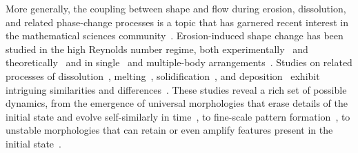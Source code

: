 \documentclass[11pt]{article}
\begin{document}
More generally, the coupling between shape and flow during erosion, dissolution, and related phase-change processes is a topic that has garnered recent interest in the mathematical sciences community~\cite{Ristroph2012, rycroft2016asymmetric, cohen2016erosion, MooreCPAM2017, mitchell2017generalized, Quaife2018, wykes2018self, lachaussee2018competitive, lopez2018cfd, ristroph2018sculpting}.  Erosion-induced shape change has been studied in the high Reynolds number regime, both experimentally~\cite{Ristroph2012, MoorePOF2013} and theoretically~\cite{MoorePOF2013, MooreCPAM2017, hewett2017evolution} and in single~\cite{Ristroph2012, MoorePOF2013, MooreCPAM2017, lachaussee2018competitive} and multiple-body arrangements~\cite{hewett2017evolution}.  Studies on related processes of dissolution~\cite{HuangJFM2015, kondratiuk2015steadily, cohen2016erosion, claudin2017dissolution, wykes2018self, huang2017solute}, melting~\cite{Cummings1999, back2014effect, rycroft2016asymmetric, hewett2017pear, MooreCPAM2017, toppaladoddi2018combined, hewett2019evolution, favier2019rayleigh}, solidification~\cite{Huppert90, Anderson95, Cummings1999, mccue2003extinction}, and deposition~\cite{hewett2018modelling} exhibit intriguing similarities and differences~\cite{MooreCPAM2017}.  These studies reveal a rich set of possible dynamics, from the emergence of universal morphologies that erase details of the initial state and evolve self-similarly in time~\cite{MoorePOF2013, MooreCPAM2017, hewett2017pear}, to fine-scale pattern formation~\cite{cohen2016erosion, claudin2017dissolution, huang2017solute}, to unstable morphologies that can retain or even amplify features present in the initial state~\cite{claudin2017dissolution, wykes2018self}.
	
\end{document}
